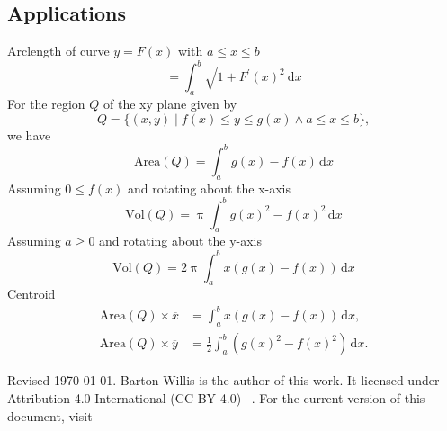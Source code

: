 \documentclass[letterpaper,9pt,fleqn]{extarticle}
\begin{document}
\begin{multicols*}{2}
\section*{Applications}
Arclength of curve \(y = F(x)\) with \(a \leq x \leq b\)
\[
   = \int_a^b \sqrt{1 + F^\prime(x)^2} \, \mathrm{d} x
\]
For the region \(Q\) of the xy plane given by
\[
   Q = \{(x,y) \mid f(x) \leq y \leq g(x) \land a \leq x \leq b \},
\]
we have
\[
  \mbox{Area}(Q) = \int_a^b g(x) - f(x) \, \mathrm{d} x
\]  
Assuming \(0 \leq f(x)\) and rotating about the \mbox{x-axis}
\[
  \mbox{Vol}(Q) = \uppi \int_a^b g(x)^2 - f(x)^2 \, \mathrm{d} x
\]
Assuming \(a \geq 0\) and rotating about the y-axis
\[
  \mbox{Vol}(Q) = 2 \uppi \int_a^b x (g(x)  - f(x)) \, \mathrm{d} x
\]
Centroid
\begin{align*}
    \mbox{Area}(Q) \times \overline{x} &=  \int_a^b x \left(g(x) - f(x) \right) \, \mathrm{d} x, \\
     \mbox{Area}(Q) \times \overline{y} &=  \frac{1}{2} \int_a^b  \left (g(x)^2  - f(x)^2 \right) \, \mathrm{d} x.
\end{align*}
\begin{comment}
For the region described by
\[
   Q = \{(x,y) \mid f(y) \leq x \leq g(y) \land a \leq y \leq b \},
\]
interchange \(x\) and \(y\) in all the previous formulas. Specifically
we have
\[
  \mbox{Area}(Q) = \int_a^b g(y) - f(y) \, \mathrm{d} y
\]  
Assuming \(0 \leq f(y)\) and rotating about the \mbox{y-axis}
\[
  \mbox{Vol}(Q) = \uppi \int_a^b g(y)^2 - f(y)^2 \, \mathrm{d} y
\]
Assuming \(a \geq 0\) and rotating about the x-axis
\[
  \mbox{Vol}(Q) = 2 \uppi \int_a^b y (g(y)  - f(y)) \, \mathrm{d} y
\]
Centroid
\begin{align*}
    \mbox{Area}(Q) \times \overline{y} &=  \int_a^b y \left(g(y) - f(y) \right) \, \mathrm{d} y \\
     \mbox{Area}(Q) \times \overline{x} &=  \frac{1}{2} \int_a^b  \left (g(y)^2  - f(y)^2 \right) \, \mathrm{d} y
\end{align*}
\end{comment}
\vfill 

\vspace{0.25in}
\noindent Revised \today. Barton Willis is the author of this work. It 
licensed under Attribution 4.0 International (CC BY 4.0) \,  . For the current version of
this document, visit \,  

\end{multicols*}
\end{document}
